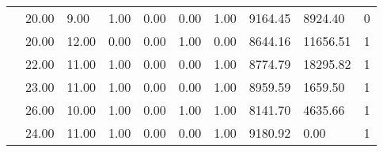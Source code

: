 \begin{table*}[h]
\begin{tabular}{llllllllll}
\multicolumn{1}{l|}{}                   & \multicolumn{1}{l|}{20.00}        & \multicolumn{1}{l|}{9.00}               & \multicolumn{1}{l|}{1.00}           & \multicolumn{1}{l|}{0.00}              & \multicolumn{1}{l|}{0.00}             & \multicolumn{1}{l|}{1.00}              & \multicolumn{1}{l|}{9164.45}       & \multicolumn{1}{l|}{8924.40}       & \multicolumn{1}{l|}{0}          \\ \cline{2-10} 
\multicolumn{1}{l|}{}                   & \multicolumn{1}{l|}{20.00}        & \multicolumn{1}{l|}{12.00}              & \multicolumn{1}{l|}{0.00}           & \multicolumn{1}{l|}{0.00}              & \multicolumn{1}{l|}{1.00}             & \multicolumn{1}{l|}{0.00}              & \multicolumn{1}{l|}{8644.16}       & \multicolumn{1}{l|}{11656.51}      & \multicolumn{1}{l|}{1}          \\ \cline{2-10} 
\multicolumn{1}{l|}{}                   & \multicolumn{1}{l|}{22.00}        & \multicolumn{1}{l|}{11.00}              & \multicolumn{1}{l|}{1.00}           & \multicolumn{1}{l|}{0.00}              & \multicolumn{1}{l|}{0.00}             & \multicolumn{1}{l|}{1.00}              & \multicolumn{1}{l|}{8774.79}       & \multicolumn{1}{l|}{18295.82}      & \multicolumn{1}{l|}{1}          \\ \cline{2-10} 
\multicolumn{1}{l|}{}                   & \multicolumn{1}{l|}{23.00}        & \multicolumn{1}{l|}{11.00}              & \multicolumn{1}{l|}{1.00}           & \multicolumn{1}{l|}{0.00}              & \multicolumn{1}{l|}{0.00}             & \multicolumn{1}{l|}{1.00}              & \multicolumn{1}{l|}{8959.59}       & \multicolumn{1}{l|}{1659.50}       & \multicolumn{1}{l|}{1}          \\ \cline{2-10} 
\multicolumn{1}{l|}{}                   & \multicolumn{1}{l|}{26.00}        & \multicolumn{1}{l|}{10.00}              & \multicolumn{1}{l|}{1.00}           & \multicolumn{1}{l|}{0.00}              & \multicolumn{1}{l|}{1.00}             & \multicolumn{1}{l|}{1.00}              & \multicolumn{1}{l|}{8141.70}       & \multicolumn{1}{l|}{4635.66}       & \multicolumn{1}{l|}{1}          \\ \cline{2-10} 
\multicolumn{1}{l|}{}                   & \multicolumn{1}{l|}{24.00}        & \multicolumn{1}{l|}{11.00}              & \multicolumn{1}{l|}{1.00}           & \multicolumn{1}{l|}{0.00}              & \multicolumn{1}{l|}{0.00}             & \multicolumn{1}{l|}{1.00}              & \multicolumn{1}{l|}{9180.92}       & \multicolumn{1}{l|}{0.00}          & \multicolumn{1}{l|}{1}          \\ \cline{2-10} 

\end{tabular}
\end{table*}
